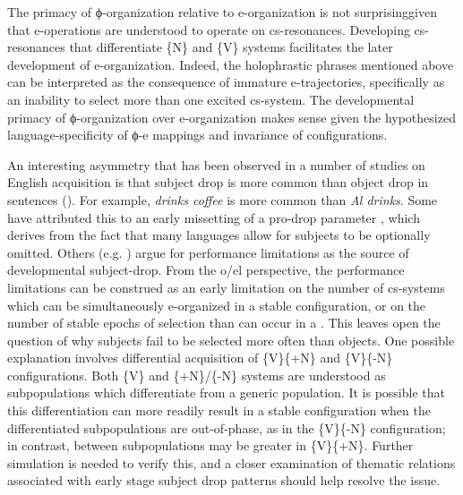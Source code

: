 The primacy of ϕ-organization relative to e-organization is not surprising\linebreak given that e-operations are understood to operate on cs-res\-o\-nances. Developing cs-res\-o\-nances that differentiate \{N\} and \{V\} systems facilitates the later development of e-organization. Indeed, the holophrastic phrases mentioned above can be interpreted as the consequence of immature e-trajectories, specifically as an inability to select more than one excited cs-system. The developmental primacy of ϕ{}-organization over e-organization makes sense given the hypothesized language-specificity of ϕ{}-e mappings and invariance of  configurations.

  An interesting asymmetry that has been observed in a number of studies on English acquisition is that subject drop is more common than object drop in  sentences (\citealt{PBloom1990,Valian1991}). For example, \textit{drinks coffee} is more common than \textit{Al drinks}. Some have attributed this to an early missetting of a pro-drop parameter \citep{Hyams2012}, which derives from the fact that many languages allow for subjects to be optionally omitted. Others (e.g. \citealt{PBloom1990}) argue for performance limitations as the source of developmental subject-drop. From the o/el perspective, the performance limitations can be construed as an early limitation on the number of cs-systems which can be simultaneously e-organized in a stable configuration, or on the number of stable epochs of selection than can occur in a . This leaves open the question of why  subjects fail to be selected more often than objects. One possible explanation involves differential acquisition of \{V\}\{+N\} and \{V\}\{-N\} configurations. Both \{V\} and \{+N\}/\{-N\} systems are understood as subpopulations which differentiate from a generic  population. It is possible that this differentiation can more readily result in a stable configuration when the differentiated subpopulations are out-of-phase, as in the \{V\}\{-N\} configuration; in contrast,  between subpopulations may be greater in \{V\}\{+N\}. Further simulation is needed to verify this, and a closer examination of thematic relations associated with early stage subject drop patterns should help resolve the issue.

